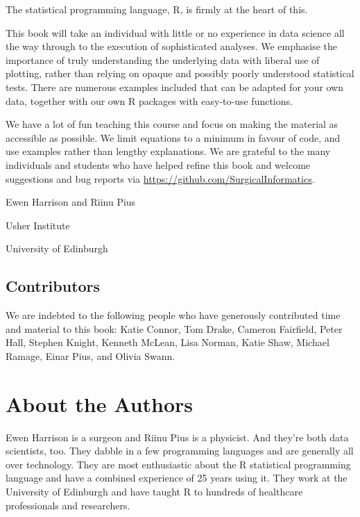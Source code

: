 \documentclass[
  12pt,
  krantz2]{krantz}
\begin{document}
The statistical programming language, R, is firmly at the heart of this.

This book will take an individual with little or no experience in data science all the way through to the execution of sophisticated analyses.
We emphasise the importance of truly understanding the underlying data with liberal use of plotting, rather than relying on opaque and possibly poorly understood statistical tests.
There are numerous examples included that can be adapted for your own data, together with our own R packages with easy-to-use functions.

We have a lot of fun teaching this course and focus on making the material as accessible as possible.
We limit equations to a minimum in favour of code, and use examples rather than lengthy explanations.
We are grateful to the many individuals and students who have helped refine this book and welcome suggestions and bug reports via \url{https://github.com/SurgicalInformatics}.

\begin{flushright}
Ewen Harrison and Riinu Pius

Usher Institute

University of Edinburgh  
\end{flushright}

\hypertarget{contributors}{%
\section*{Contributors}\label{contributors}}


We are indebted to the following people who have generously contributed time and material to this book: Katie Connor, Tom Drake, Cameron Fairfield, Peter Hall, Stephen Knight, Kenneth McLean, Lisa Norman, Katie Shaw, Michael Ramage, Einar Pius, and Olivia Swann.

\hypertarget{about-the-authors}{%
\chapter*{About the Authors}\label{about-the-authors}}


Ewen Harrison is a surgeon and Riinu Pius is a physicist.
And they're both data scientists, too.
They dabble in a few programming languages and are generally all over technology.
They are most enthusiastic about the R statistical programming language and have a combined experience of 25 years using it.
They work at the University of Edinburgh and have taught R to hundreds of healthcare professionals and researchers.
\end{document}
